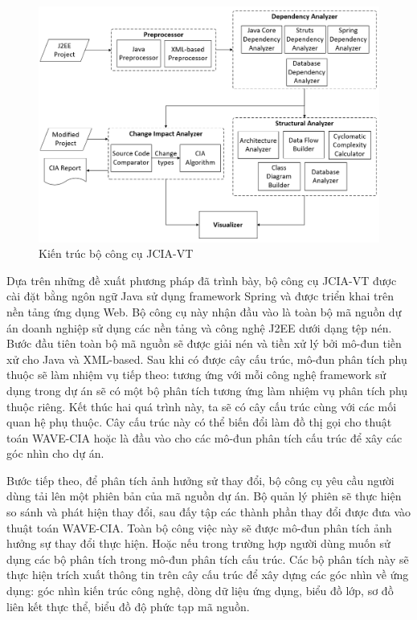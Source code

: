 \documentclass[12pt]{report}
\begin{document}
\begin{figure}[h]
	\centering
	\includegraphics[scale=0.7]{jcia-vt-architecture}
	\caption{Kiến trúc bộ công cụ JCIA-VT}
	\label{fig:jcia-vt-architecture}
\end{figure}

Dựa trên những đề xuất phương pháp đã trình bày, bộ công cụ JCIA-VT được cài đặt bằng ngôn ngữ Java sử dụng framework Spring và được triển khai trên nền tảng ứng dụng Web. Bộ công cụ này nhận đầu vào là toàn bộ mã nguồn dự án doanh nghiệp sử dụng các nền tảng và công nghệ J2EE dưới dạng tệp nén. Bước đầu tiên toàn bộ mã nguồn sẽ được giải nén và tiền xử lý bởi mô-đun tiền xử cho Java và XML-based. Sau khi có được cây cấu trúc, mô-đun phân tích phụ thuộc sẽ làm nhiệm vụ tiếp theo: tương ứng với mỗi công nghệ framework sử dụng trong dự án sẽ có một bộ phân tích tương ứng làm nhiệm vụ phân tích phụ thuộc riêng. Kết thúc hai quá trình này, ta sẽ có cây cấu trúc cùng với các mối quan hệ phụ thuộc. Cây cấu trúc này có thể biến đổi làm đồ thị gọi cho thuật toán WAVE-CIA hoặc là đầu vào cho các mô-đun phân tích cấu trúc để xây các góc nhìn cho dự án.

Bước tiếp theo, để phân tích ảnh hưởng sử thay đổi, bộ công cụ yêu cầu người dùng tải lên một phiên bản của mã nguồn dự án. Bộ quản lý phiên sẽ thực hiện so sánh và phát hiện thay đổi, sau đấy tập các thành phần thay đổi được đưa vào thuật toán WAVE-CIA. Toàn bộ công việc này sẽ được mô-đun phân tích ảnh hưởng sự thay đổi thực hiện. Hoặc nếu trong trường hợp người dùng muốn sử dụng các bộ phân tích trong mô-đun phân tích cấu trúc. Các bộ phân tích này sẽ thực hiện trích xuất thông tin trên cây cấu trúc để xây dựng các góc nhìn về ứng dụng: góc nhìn kiến trúc công nghệ, dòng dữ liệu ứng dụng, biểu đồ lớp, sơ đồ liên kết thực thể, biểu đồ độ phức tạp mã nguồn.
\end{document}
